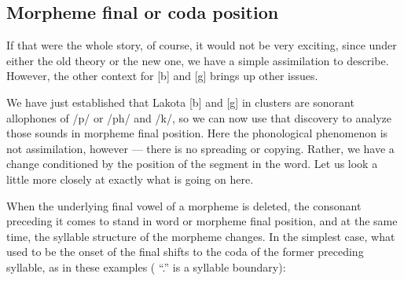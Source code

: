 \documentclass[output=paper]{LSP/langsci}
\begin{document}
\begin{exe}
\begin{xlist}
\pagebreak

\ex  {\hspace{1em}}\newline
{}
\end{xlist}
\end{exe}

\subsection{Morpheme final or coda position}

If that were the whole story, of course, it would not be very exciting, since under either the old theory or the new one, we have a simple assimilation to describe. However, the other context for [b] and [g] brings up other issues.

We have just established that Lakota [b] and [g] in clusters are sonorant allophones of /p/ or /ph/ and /k/, so we can now use that discovery to analyze those sounds in morpheme final position. Here the phonological phenomenon is not assimilation, however --- there is no spreading or copying. Rather, we have a change conditioned by the position of the segment in the word. Let us look a little more closely at exactly what is going on here.

When the underlying final vowel of a morpheme is deleted, the consonant preceding it comes to stand in word or morpheme final position, and at the same time, the syllable structure of the morpheme changes. In the simplest case, what used to be the onset of the final shifts to the coda of the former preceding syllable, as in these examples ( ``.'' is a syllable boundary):
\end{document}

